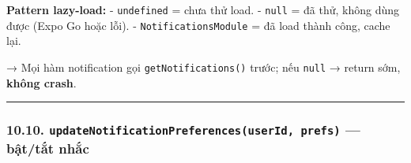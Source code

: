 \documentclass[12pt,a4paper]{article}
\begin{document}
\begin{Shaded}
\begin{Highlighting}[]
\OperatorTok{=} \OperatorTok{===}\OperatorTok{;}

  \NormalTok{()}\OperatorTok{:} \OperatorTok{\textless{}}\OperatorTok{|} \OperatorTok{\textgreater{}}\NormalTok{ \{}
   \OperatorTok{;}  

  \OperatorTok{===} \NormalTok{) \{}
    \NormalTok{ \{}
\OperatorTok{=}  \NormalTok{(}\NormalTok{)}\OperatorTok{;}  
\NormalTok{(\{ }\NormalTok{ \})}\OperatorTok{;}
\NormalTok{    \} }\NormalTok{ \{}
\OperatorTok{=} \OperatorTok{;}
\NormalTok{    \}}
\NormalTok{  \}}
  \OperatorTok{;}
\NormalTok{\}}
\end{Highlighting}
\end{Shaded}

\textbf{Pattern lazy-load:} - \texttt{undefined} = chưa thử load. -
\texttt{null} = đã thử, không dùng được (Expo Go hoặc lỗi). -
\texttt{NotificationsModule} = đã load thành công, cache lại.

→ Mọi hàm notification gọi \texttt{getNotifications()} trước; nếu
\texttt{null} → return sớm, \textbf{không crash}.

\begin{center}\rule{0.5\linewidth}{0.5pt}\end{center}

\subsubsection{\texorpdfstring{10.10.
\texttt{updateNotificationPreferences(userId,\ prefs)} --- bật/tắt
nhắc}{10.10. updateNotificationPreferences(userId, prefs) --- bật/tắt nhắc}}\label{updatenotificationpreferencesuserid-prefs-bux1eadttux1eaft-nhux1eafc}
\end{document}
